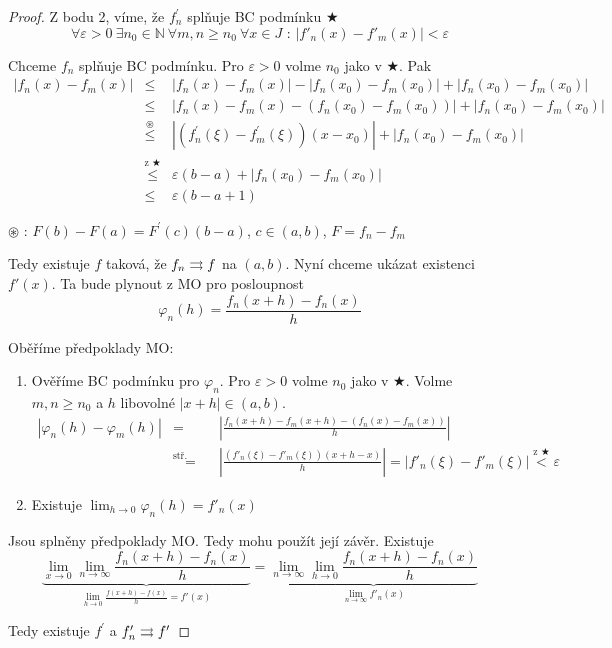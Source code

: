 \begin{proof}
Z bodu 2, víme, že $f^\prime_n$ splňuje BC podmínku $\bigstar$ 
$$\forall \varepsilon > 0 \ \exists n_0 \in \mathbb{N} \ \forall m,n \geq n_0 \ \forall x \in J \textrm{ : } |f'_n(x) - f'_m(x)| < \varepsilon $$

Chceme $f_n$ splňuje BC podmínku. Pro $\varepsilon > 0$ volme $n_0$ jako v $\bigstar$. Pak
\begin{eqnarray*}
|f_n(x) - f_m(x)| & \leq & |f_n(x) - f_m(x)| - |f_n(x_0) - f_m(x_0)| + |f_n(x_0) - f_m(x_0)| \\
& \leq & |f_n(x) - f_m(x) - (f_n(x_0) - f_m(x_0))| + |f_n(x_0) - f_m(x_0)| \\
& \overset{\circledast}{\leq} & |(f_n^\prime(\xi)-f_m^\prime(\xi))(x-x_0)| + |f_n(x_0) - f_m(x_0)| \\ 
& \overset{\textrm{z $\bigstar$}}{\leq} & \varepsilon (b-a) + |f_n(x_0) - f_m(x_0)| \\
& \leq & \varepsilon (b-a+1)
\end{eqnarray*}

$\circledast$ : $F(b)-F(a) = F^\prime(c)(b-a)$, $c \in (a,b)$, $F=f_n - f_m$

Tedy existuje $f$ taková, že $f_n \rightrightarrows f$ na $(a,b)$. Nyní chceme ukázat existenci $f'(x)$. Ta bude plynout z MO pro posloupnost
$$\varphi_n (h) = \frac{f_n(x+h)-f_n(x)}{h}$$

Oběříme předpoklady MO:
\begin{enumerate}
\item Ověříme BC podmínku pro $\varphi_n$. Pro $\varepsilon > 0$ volme $n_0$ jako v $\bigstar$. Volme $m,n \geq n_0$ a $h$ libovolné $|x+h| \in (a,b)$.
\begin{eqnarray*}
|\varphi_n(h) - \varphi_m(h)| & = & \left| \frac{f_n(x+h) - f_m(x+h) - (f_n(x) - f_m(x))}{h} \right| \\
& \overset{\textrm{stř. hodnota}}{=} & \left| \frac{(f'_n(\xi) - f'_m(\xi))(x+h-x)}{h} \right| = | f'_n(\xi) - f'_m(\xi) | \overset{\textrm{z $\bigstar$}}{<} \varepsilon
\end{eqnarray*}

\item Existuje $\lim_{h \to 0} \varphi_n (h) = f'_n(x)$
\end{enumerate}

Jsou splněny předpoklady MO. Tedy mohu použít její závěr. Existuje
$$\underbrace{\lim_{x \to 0} \lim_{n \to \infty} \frac{f_n(x+h) - f_n(x)}{h}}_{\lim_{h \to 0} \frac{f(x+h) - f(x)}{h} = f'(x)} = \underbrace{\lim_{n \to \infty} \lim_{h \to 0} \frac {f_n(x+h) - f_n(x)}{h}}_{\lim_{n \to \infty} f'_n(x)}$$

Tedy existuje $f^\prime$ a $f'_n \rightrightarrows f' $
\end{proof}
